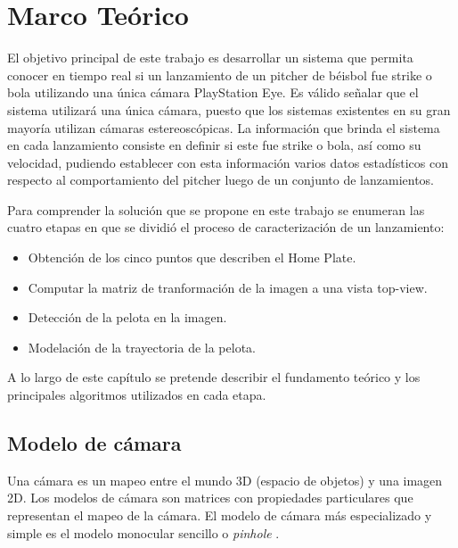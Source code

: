 \chapter{Marco Teórico}\label{chapter:theorical}

El objetivo principal de este trabajo es desarrollar un sistema que permita conocer en tiempo real si un lanzamiento de un pitcher de béisbol fue strike o bola utilizando una única cámara PlayStation Eye. Es válido señalar que el sistema utilizará una única cámara, puesto que los sistemas existentes en su gran mayoría utilizan cámaras estereoscópicas. La información que brinda el sistema en cada lanzamiento consiste en definir si este fue strike o bola, así como su velocidad, pudiendo establecer con esta información varios datos estadísticos con respecto al comportamiento del pitcher luego de un conjunto de lanzamientos.

Para comprender la solución que se propone en este trabajo se enumeran las cuatro etapas en que se dividió el proceso de caracterización de un lanzamiento:

\begin{itemize}
    \item Obtención de los cinco puntos que describen el Home Plate.
    \item Computar la matriz de tranformación de la imagen a una vista top-view.
    \item Detección de la pelota en la imagen.
    \item Modelación de la trayectoria de la pelota.
\end{itemize}

A lo largo de este capítulo se pretende describir el fundamento teórico y los principales algoritmos utilizados en cada etapa.

\section{Modelo de cámara}

Una cámara es un mapeo entre el mundo 3D (espacio de objetos) y una imagen 2D. Los modelos de cámara son matrices con propiedades particulares que representan el mapeo de la cámara. El modelo de cámara más especializado y simple es el modelo monocular sencillo o \textit{pinhole} \cite{RichardAndrew}.\\

